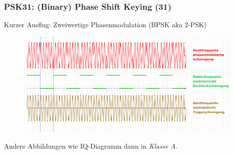\begin{frame}
  \frametitle{PSK31: (\textbf{B}inary) \textbf{P}hase \textbf{S}hift \textbf{K}eying (31)}

  Kurzer Ausflug: Zweiwertige Phasenmodulation (BPSK aka 2-PSK)

  \begin{center}
    \begin{figure}
      \includegraphics[width=.9\textwidth,height=.5\textheight,keepaspectratio]{e16/Phase_modulation_x800.png}
    \end{figure}
  \end{center}

  Andere Abbildungen wie IQ-Diagramm dann in \emph{Klasse A}.

\end{frame}


